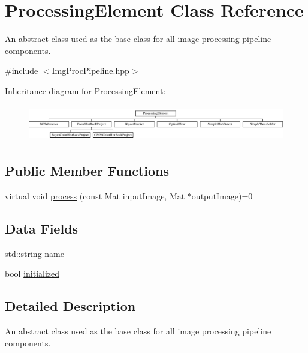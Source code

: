 \hypertarget{classProcessingElement}{\section{\-Processing\-Element \-Class \-Reference}
\label{classProcessingElement}
}


\-An abstract class used as the base class for all image processing pipeline components.  




{\ttfamily \#include $<$\-Img\-Proc\-Pipeline.\-hpp$>$}

\-Inheritance diagram for \-Processing\-Element\-:\begin{figure}[H]
\begin{center}
\leavevmode
\includegraphics[height=1.600000cm]{classProcessingElement}
\end{center}
\end{figure}
\subsection*{\-Public \-Member \-Functions}
\begin{DoxyCompactItemize}
\item 
virtual void \hyperlink{classProcessingElement_ad231c2198b3c9bbc562328ee84a972ce}{process} (const \-Mat input\-Image, \-Mat $\ast$output\-Image)=0
\end{DoxyCompactItemize}
\subsection*{\-Data \-Fields}
\begin{DoxyCompactItemize}
\item 
std\-::string \hyperlink{classProcessingElement_a936ab69e799e7bc4b60f35815d8856f0}{name}
\item 
bool \hyperlink{classProcessingElement_ad3d55eb51858b90d70f869c9d9166cbb}{initialized}
\end{DoxyCompactItemize}


\subsection{\-Detailed \-Description}
\-An abstract class used as the base class for all image processing pipeline components. 

